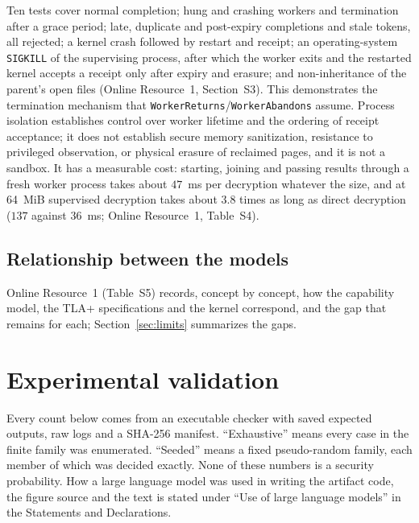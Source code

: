 \documentclass[pdflatex,sn-mathphys-num]{sn-jnl}%
\theoremstyle{plain}
\theoremstyle{definition}
\newcommand{\code}[1]{\texttt{#1}}
\begin{document}
Ten tests cover normal completion; hung and crashing workers and termination after a grace period; late, duplicate and post-expiry completions and stale tokens, all rejected; a kernel crash followed by restart and receipt; an operating-system \code{SIGKILL} of the supervising process, after which the worker exits and the restarted kernel accepts a receipt only after expiry and erasure; and non-inheritance of the parent's open files (Online Resource~1, Section~S3). This demonstrates the termination mechanism that \code{WorkerReturns}/\code{WorkerAbandons} assume. Process isolation establishes control over worker lifetime and the ordering of receipt acceptance; it does not establish secure memory sanitization, resistance to privileged observation, or physical erasure of reclaimed pages, and it is not a sandbox. It has a measurable cost: starting, joining and passing results through a fresh worker process takes about $47$~ms per decryption whatever the size, and at 64~MiB supervised decryption takes about $3.8$ times as long as direct decryption ($137$ against $36$~ms; Online Resource~1, Table~S4).

\subsection{Relationship between the models}
Online Resource~1 (Table~S5) records, concept by concept, how the capability model, the TLA+ specifications and the kernel correspond, and the gap that remains for each; Section~\ref{sec:limits} summarizes the gaps.


\section{Experimental validation}\label{sec:evidence}

Every count below comes from an executable checker with saved expected outputs, raw logs and a SHA-256 manifest. ``Exhaustive'' means every case in the finite family was enumerated. ``Seeded'' means a fixed pseudo-random family, each member of which was decided exactly. None of these numbers is a security probability. How a large language model was used in writing the artifact code, the figure source and the text is stated under ``Use of large language models'' in the Statements and Declarations.
\end{document}
